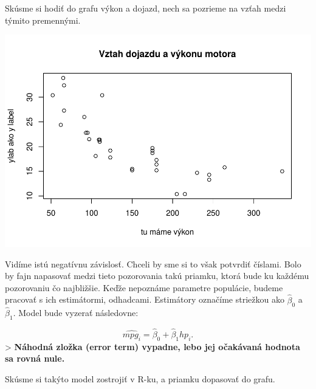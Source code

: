 \documentclass[]{article}
\newenvironment{Shaded}{\begin{snugshade}}{\end{snugshade}}
\newcommand{\CommentTok}[1]{\textcolor[rgb]{0.56,0.35,0.01}{\textit{#1}}}
\newcommand{\DataTypeTok}[1]{\textcolor[rgb]{0.13,0.29,0.53}{#1}}
\newcommand{\KeywordTok}[1]{\textcolor[rgb]{0.13,0.29,0.53}{\textbf{#1}}}
\newcommand{\NormalTok}[1]{#1}
\newcommand{\OperatorTok}[1]{\textcolor[rgb]{0.81,0.36,0.00}{\textbf{#1}}}
\newcommand{\StringTok}[1]{\textcolor[rgb]{0.31,0.60,0.02}{#1}}
\begin{document}
Skúsme si hodiť do grafu výkon a dojazd, nech sa pozrieme na vzťah medzi
týmito premennými.

\begin{Shaded}
\end{Shaded}

\includegraphics{test_files/figure-latex/unnamed-chunk-39-1.pdf}

Vidíme istú negatívnu závislosť. Chceli by sme si to však potvrdiť
číslami. Bolo by fajn napasovať medzi tieto pozorovania takú priamku,
ktorá bude ku každému pozorovaniu čo najbližšie. Keďže nepoznáme
parametre populácie, budeme pracovať s ich estimátormi, odhadcami.
Estimátory označíme striežkou ako \(\hat\beta_0{}\) a \(\hat\beta_1{}\).
Model bude vyzerať následovne:

\[\hat{mpg_i} = \hat\beta_0 + \hat \beta_1{hp_i}.\] \textgreater{}
\textbf{Náhodná zložka (error term) vypadne, lebo jej očakávaná hodnota
sa rovná nule.}

Skúsme si takýto model zostrojiť v R-ku, a priamku dopasovať do grafu.
\end{document}
